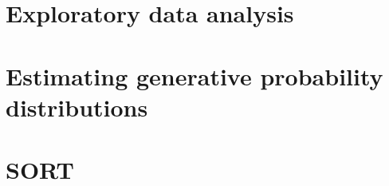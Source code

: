 \documentclass[oneside]{book}
\begin{document}
\part{Exploratory data analysis}







\part{Estimating generative probability distributions}













\part{SORT}

\end{document}
